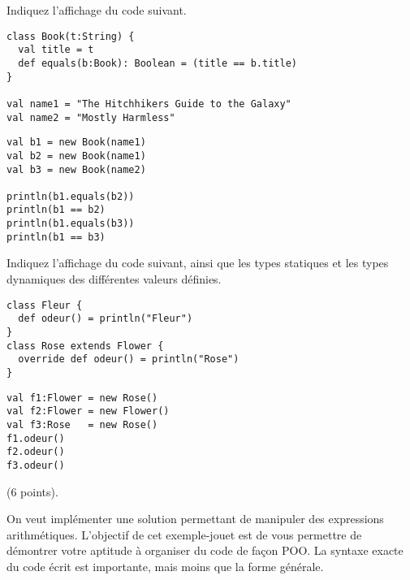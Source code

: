\documentclass[a4paper,10pt]{article}
\begin{document}
\Question Indiquez l'affichage du code suivant.

\begin{minipage}[t]{.5\linewidth}
\begin{Verbatim}[fontsize=\footnotesize]
class Book(t:String) {
  val title = t
  def equals(b:Book): Boolean = (title == b.title)
}

val name1 = "The Hitchhikers Guide to the Galaxy"
val name2 = "Mostly Harmless"

\end{Verbatim}
\end{minipage}%
\hfill
\begin{minipage}[t]{.4\linewidth}
\begin{Verbatim}[fontsize=\footnotesize,firstnumber=last]
val b1 = new Book(name1)
val b2 = new Book(name1)
val b3 = new Book(name2)

println(b1.equals(b2))
println(b1 == b2)
println(b1.equals(b3))
println(b1 == b3)
\end{Verbatim}
\end{minipage}

\Question Indiquez l'affichage du code suivant, ainsi que les types
statiques et les types  dynamiques des différentes valeurs définies.

\begin{minipage}[t]{.5\linewidth}
\begin{Verbatim}[fontsize=\footnotesize]
class Fleur {
  def odeur() = println("Fleur")
}
class Rose extends Flower {
  override def odeur() = println("Rose")
}
\end{Verbatim}
\end{minipage}%
\hfill
\begin{minipage}[t]{.4\linewidth}
\begin{Verbatim}[fontsize=\footnotesize,firstnumber=last]
val f1:Flower = new Rose()
val f2:Flower = new Flower()
val f3:Rose   = new Rose()
f1.odeur()
f2.odeur()
f3.odeur()
\end{Verbatim}
\end{minipage}

\bigskip
{} (6 points).

\smallskip\noindent On veut implémenter une solution permettant de
manipuler des expressions arithmétiques. L'objectif de cet
exemple-jouet est de vous permettre de démontrer votre aptitude à
organiser du code de façon POO. La syntaxe exacte du code écrit est
importante, mais moins que la forme générale.
\end{document}

